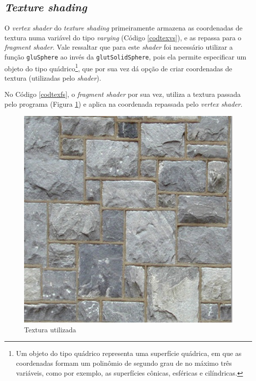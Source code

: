\subsection{\textit{Texture shading}}

	O \textit{vertex shader} do \textit{texture shading} primeiramente armazena as coordenadas de textura numa variável do tipo \textit{varying} (Código \ref{codtexvs}), e as repassa para o \textit{fragment shader}. Vale ressaltar que para este \textit{shader} foi necessário utilizar a função \texttt{gluSphere} ao invés da \texttt{glutSolidSphere}, pois ela permite especificar um objeto do tipo quádrico\footnote{Um objeto do tipo quádrico representa uma superfície quádrica, em que as coordenadas formam um polinômio de segundo grau de no máximo três variáveis, como por exemplo, as superfícies cônicas, esféricas e cilíndricas.}, que por sua vez dá opção de criar coordenadas de textura (utilizadas pelo \textit{shader}).  

	

	No Código \ref{codtexfs}, o \textit{fragment shader} por sua vez, utiliza a textura passada pelo programa (Figura \ref{tex}) e aplica na coordenada repassada pelo  \textit{vertex shader}.

	\begin{figure}[h]
	\centering
		\includegraphics[keepaspectratio=true,scale=0.4]{figuras/tex.jpg}
	\caption{Textura utilizada}
	\label{tex}
	\end{figure}

